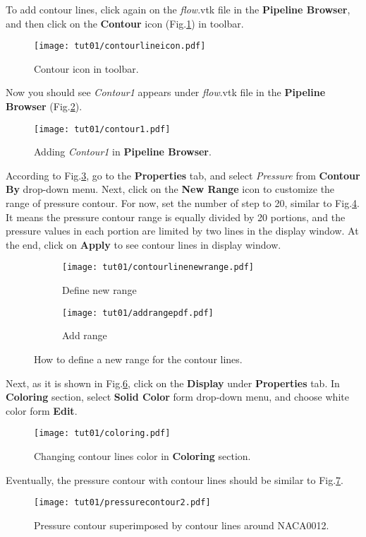 To add contour lines, click again on the \textit{flow}.vtk file in the \textbf{Pipeline Browser}, and then click on the \textbf{Contour} icon (Fig.\ref{fig1:contour_icon}) in toolbar.
\begin{figure}[htbp]
    \centering
    \texttt{[image: tut01/contourlineicon.pdf]}
    \caption{Contour icon in toolbar.}
    \label{fig1:contour_icon}
\end{figure}
Now you should see \textit{Contour1} appears under \textit{flow}.vtk file in the \textbf{Pipeline Browser} (Fig.\ref{fig1:contour1}).
\begin{figure}[htbp]
    \centering
    \texttt{[image: tut01/contour1.pdf]}
    \caption{Adding \textit{Contour1} in \textbf{Pipeline Browser}.}
    \label{fig1:contour1}
\end{figure}
According to Fig.\ref{fig1:contourby a}, go to the \textbf{Properties} tab, and select \textit{Pressure} from \textbf{Contour By} drop-down menu. Next, click on the \textbf{New Range} icon to customize the range of pressure contour. For now, set the number of step to 20, similar to Fig.\ref{fig1:contourby b}. It means the pressure contour range is equally divided by 20 portions, and the pressure values in each portion are limited by two lines in the display window. At the end, click on \textbf{Apply} to see contour lines in display window.
\begin{figure}[htbp]
    \centering
     \begin{subfigure}[b]{.4\textwidth}
         \centering
         \texttt{[image: tut01/contourlinenewrange.pdf]}
         \caption{Define new range}
         \label{fig1:contourby a}
     \end{subfigure}
     \hfill
     \begin{subfigure}[b]{.4\textwidth}
         \centering
         \texttt{[image: tut01/addrangepdf.pdf]}
         \caption{Add range}
         \label{fig1:contourby b}
     \end{subfigure}     
    \caption{How to define a new range for the contour lines.}
    \label{fig1:contourby}
\end{figure}
Next, as it is shown in Fig.\ref{fig1:colorby2}, click on the \textbf{Display} under \textbf{Properties} tab. In \textbf{Coloring} section, select \textbf{Solid Color} form drop-down menu, and choose white color form \textbf{Edit}.
\begin{figure}[htbp]
    \centering
    \texttt{[image: tut01/coloring.pdf]}
    \caption{Changing contour lines color in \textbf{Coloring} section.}
    \label{fig1:colorby2}
\end{figure}
Eventually, the pressure contour with contour lines should be similar to Fig.\ref{fig1:pressure_contour_lines}.
\begin{figure}[htbp]
    \centering
    \texttt{[image: tut01/pressurecontour2.pdf]}
    \caption{Pressure contour superimposed by contour lines around NACA0012.}
    \label{fig1:pressure_contour_lines}
\end{figure}
